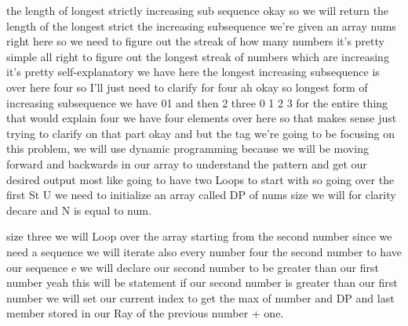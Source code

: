 \expandafter\def\csname sourceexcerpt@72\endcsname{%
the length of longest strictly increasing sub sequence okay so we will return the
length of the longest strict the increasing subsequence we're given an array nums
right here so we need to figure out the streak of how many numbers it's pretty simple
all right to figure out the longest streak of numbers which are increasing it's pretty
self-explanatory we have here the longest increasing subsequence is over here four so
I'll just need to clarify for four ah okay so longest form of increasing subsequence
we have 01 and then 2 three 0 1 2 3 for the entire thing that would explain four we
have four elements over here so that makes sense just trying to clarify on that part
okay and but the tag we're going to be focusing on this problem, we will use
dynamic programming because we will be moving forward and backwards in our array to
understand the pattern and get our desired output most like going to have two Loops to
start with so going over the first St U we need to initialize an array called DP of
nums size we will for clarity decare and N is equal to num.

size three we will Loop over the array starting from the second number since we need a
sequence we will iterate also every number four the second number to have our sequence
e we will declare our second number to be greater than our first number yeah this will
be statement if our second number is greater than our first number we will set our
current index to get the max of number and DP and last member stored in our Ray of the
previous number + one.
}
